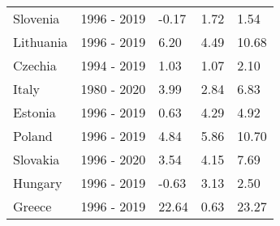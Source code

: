\begin{table}[pos = H]
{{\begin{tabular}{lllll}
\addlinespace
Slovenia & 1996 - 2019 & -0.17 & 1.72 & 1.54\\
Lithuania & 1996 - 2019 & 6.20 & 4.49 & 10.68\\
Czechia & 1994 - 2019 & 1.03 & 1.07 & 2.10\\
Italy & 1980 - 2020 & 3.99 & 2.84 & 6.83\\
Estonia & 1996 - 2019 & 0.63 & 4.29 & 4.92\\
\addlinespace
Poland & 1996 - 2019 & 4.84 & 5.86 & 10.70\\
Slovakia & 1996 - 2020 & 3.54 & 4.15 & 7.69\\
Hungary & 1996 - 2019 & -0.63 & 3.13 & 2.50\\
Greece & 1996 - 2019 & 22.64 & 0.63 & 23.27\\
\bottomrule \end{tabular}
}

}
\end{table}
